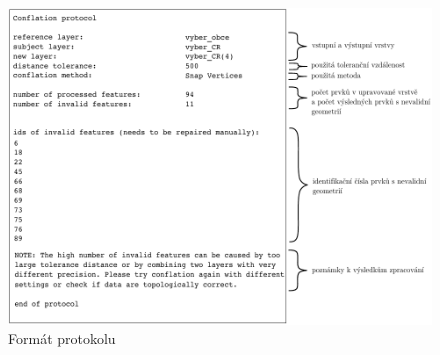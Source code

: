 \label{protokol}
  \begin{figure}[hbt]
    \centering
      \includegraphics{./pictures/protokol.pdf}
      \caption{Formát protokolu}
      \label{fig:protokol}
  \end{figure} 